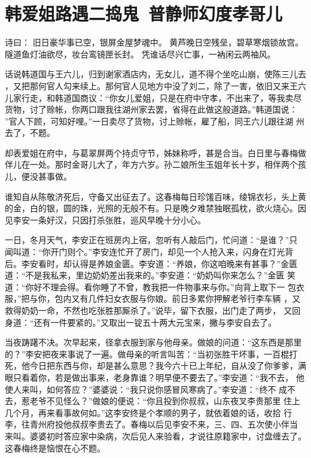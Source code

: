 \chapter{韩爱姐路遇二捣鬼~普静师幻度孝哥儿}

诗曰：
旧日豪华事已空，银屏金屋梦魂中。
黄芦晚日空残垒，碧草寒烟锁故宫。
隧道鱼灯油欲尽，妆台鸾镜匣长封。
凭谁话尽兴亡事，一衲闲云两袖风。

话说韩道国与王六儿，归到谢家酒店内，无女儿，道不得个坐吃山崩，使陈三儿去
，又把那何官人勾来续上。那何官人见地方中没了刘二，除了一害，依旧又来王六
儿家行走，和韩道国商议：“你女儿爱姐，只是在府中守孝，不出来了，等我卖尽
货物，讨了赊帐，你两口跟我往湖州家去罢，省得在此做这般道路。”韩道国说：
”官人下顾，可知好哩。”一日卖尽了货物，讨上赊帐，雇了船，同王六儿跟往湖
州去了，不题。

却表爱姐在府中，与葛翠屏两个持贞守节，姊妹称呼，甚是合当。白日里与春梅做
伴儿在一处。那时金哥儿大了，年方六岁。孙二娘所生玉姐年长十岁，相伴两个孩
儿，便没甚事做。

谁知自从陈敬济死后，守备又出征去了。这春梅每日珍馐百味，绫锦衣衫，头上黄
的金，白的银，圆的珠，光照的无般不有。只是晚夕难禁独眠孤枕，欲火烧心。因
见李安一条好汉，只因打杀张胜，巡风早晚十分小心。

一日，冬月天气，李安正在班房内上宿，忽听有人敲后门，忙问道：“是谁？”只
闻叫道：“你开门则个。”李安连忙开了房门，却见一个人抢入来，闪身在灯光背
后。李安看时，却认得是养娘金匮。李安道：“养娘，你这咱晚来有甚事？”金匮
道：“不是我私来，里边奶奶差出我来的。”李安道：“奶奶叫你来怎么？”金匮
笑道：“你好不理会得。看你睡了不曾，教我把一件物事来与你。”向背上取下一
包衣服，”把与你，包内又有几件妇女衣服与你娘。前日多累你押解老爷行李车辆
，又救得奶奶一命，不然也吃张胜那厮杀了。”说毕，留下衣服，出门走了两步，
又回身道：“还有一件要紧的。”又取出一锭五十两大元宝来，撇与李安自去了。

当夜踌躇不决。次早起来，径拿衣服到家与他母亲。做娘的问道：“这东西是那里
的？”李安把夜来事说了一遍。做母亲的听言叫苦：“当初张胜干坏事，一百棍打
死，他今日把东西与你，却是甚么意思？我今六十已上年纪，自从没了你爹爹，满
眼只看着你，若是做出事来，老身靠谁？明早便不要去了。”李安道：“我不去，
他使人来叫，如何答应？”婆婆说：“我只说你感冒风寒病了。”李安道：“终不
成不去，惹老爷不见怪么？”做娘的便说：“你且投到你叔叔，山东夜叉李贵那里
住上几个月，再来看事故何如。”这李安终是个孝顺的男子，就依着娘的话，收拾
行李，往青州府投他叔叔李贵去了。春梅以后见李安不来，三、四、五次使小伴当
来叫。婆婆初时答应家中染病，次后见人来验看，才说往原籍家中，讨盘缠去了。
这春梅终是恼恨在心不题。

